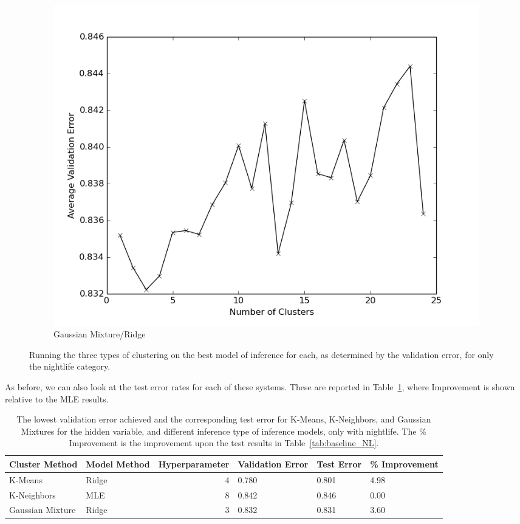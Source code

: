 \documentclass[11pt]{article}
\begin{document}
\begin{figure}[h!]
\begin{subfigure}[h!]{0.33\textwidth}
        \includegraphics[width=\textwidth]{NL_GM_ridge.png}
        \caption{Gaussian Mixture/Ridge}
        \label{fig:gmBEST}
    \end{subfigure}
    \caption{Running the three types of clustering on the best model of inference for each, as determined by the validation error, for only the nightlife category.}
    \label{fig:BEST_NL}
\end{figure}

As before, we can also look at the test error rates for each of these systems. These are reported in Table~\ref{tab:improvement_NL}, where Improvement is shown relative to the MLE results.

\begin{table}[h!]
    \begin{tabularx}{1.0\textwidth}{| l | X | r | X | X | X |}
        \hline
        Cluster Method & Model Method & Hyperparameter & Validation Error & Test Error & \% \mbox{Improvement}\\
        \hline
        K-Means & Ridge & 4 & 0.780 & 0.801 & 4.98 \\
        K-Neighbors & MLE & 8 & 0.842 & 0.846 & 0.00 \\
        Gaussian Mixture & Ridge & 3 & 0.832 & 0.831 & 3.60 \\
        \hline
    \end{tabularx}
    \caption{The lowest validation error achieved and the corresponding test error for K-Means, K-Neighbors, and Gaussian Mixtures for the hidden variable, and different inference type of inference models, only with nightlife. The \% Improvement is the improvement upon the test results in Table~\ref{tab:baseline_NL}.}
    \label{tab:improvement_NL}
\end{table}
\end{document}
